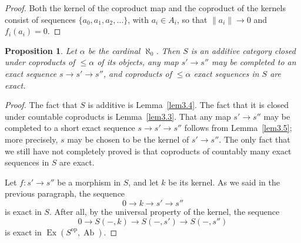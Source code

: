 \documentclass[11pt,a4paper]{article}
\theoremstyle{plain}
\newtheorem{proposition}[theorem]{Proposition}
\theoremstyle{definition}
\DeclareMathOperator{\Ex}{Ex}
\DeclareMathOperator{\Ab}{Ab}
\newcommand{\op}{\mathrm{op}}
\numberwithin{equation}{section}
\begin{document}
\begin{proof}
Both the kernel of the coproduct map and the coproduct of the kernels consist of sequences $\{a_{0}, a_{1}, a_{2}, \ldots\}$, with $a_{i} \in A_{i}$, so that $\|a_{i}\| \to 0$ and $f_{i}(a_{i}) = 0$. \qedhere
\end{proof}

\begin{proposition}\label{prop3.7}
Let $\alpha$ be the cardinal $\aleph_{0}$. Then $S$ is an additive category closed under coproducts of $\leq\alpha$ of its objects, any map $s' \to s''$ may be completed to an exact sequence $s \to s' \to s''$, and coproducts of $\leq\alpha$ exact sequences in $S$ are exact.
\end{proposition}

\begin{proof}
The fact that $S$ is additive is Lemma~\ref{lem3.4}. The fact that it is closed under countable coproducts is Lemma~\ref{lem3.3}. That any map $s' \to s''$ may be completed to a short exact sequence $s \to s' \to s''$ follows from Lemma~\ref{lem3.5}; more precisely, $s$ may be chosen to be the kernel of $s' \to s''$. The only fact that we still have not completely proved is that coproducts of countably many exact sequences in $S$ are exact.

Let $f: s' \to s''$ be a morphism in $S$, and let $k$ be its kernel. As we said in the previous paragraph, the sequence
\begin{equation*}
0 \longrightarrow k \longrightarrow s' \longrightarrow s''
\end{equation*}
is exact in $S$. After all, by the universal property of the kernel, the sequence
\begin{equation*}
0 \longrightarrow S(-,k) \longrightarrow S(-,s') \longrightarrow S(-,s'')
\end{equation*}
is exact in $\Ex(S^{\op},\Ab)$.


\end{proof}
\end{document}
